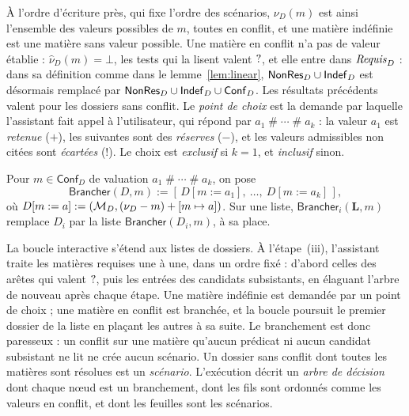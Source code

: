 \documentclass[review]{jflart}
\newcommand{\Brancher}{\ensuremath{\mathsf{Brancher}}}
\newcommand{\Liste}{\ensuremath{\mathbf L}}
\newcommand{\conflit}{\mathbin{\#}}
\newcommand{\Conf}{\ensuremath{\mathsf{Conf}_D}}
\begin{document}
À l'ordre d'écriture près, qui fixe l'ordre des scénarios, \(\nu_D(m)\) est
ainsi l'ensemble des valeurs possibles de \(m\), toutes en conflit, et une
matière indéfinie est une matière sans valeur possible. Une matière en conflit
n'a pas de valeur établie : \(\widehat\nu_D(m)=\bot\), les tests qui la lisent
valent \(\mathord{?}\), et elle entre dans \(\mathit{Requis}_D\) : dans sa définition
comme dans le lemme~\ref{lem:linear}, \(\mathsf{NonRes}_D\cup\mathsf{Indef}_D\) est désormais
remplacé par \(\Unres\cup\Undef\cup\Conf\).
Les résultats précédents valent pour les dossiers sans conflit. Le \emph{point
de choix} est la demande par laquelle l'assistant fait appel à l'utilisateur,
qui répond par \(a_1\conflit\cdots\conflit a_k\) : la valeur \(a_1\) est
\emph{retenue} (\(+\)), les suivantes sont des \emph{réserves} (\(-\)), et les
valeurs admissibles non citées sont \emph{écartées} (\(!\)). Le choix est
\emph{exclusif} si \(k=1\), et \emph{inclusif} sinon.

\begin{defi}[Branchement]\label{def:brancher}
Pour \(m\in\Conf\) de valuation \(a_1\conflit\cdots\conflit a_k\), on pose
\[
\Brancher(D,m):=[\,D[m:=a_1],\ \ldots,\ D[m:=a_k]\,],
\]
où \(D[m:=a]:=(\mathcal{M}_D,(\nu_D-m)+[m\mapsto a])\). Sur une liste,
\(\Brancher_i(\Liste,m)\) remplace \(D_i\) par la liste \(\Brancher(D_i,m)\),
à sa place.
\end{defi}

La boucle interactive s'étend aux listes de dossiers. À l'étape~(iii),
l'assistant traite les matières requises une à une, dans un ordre fixé :
d'abord celles des arêtes qui valent \(\mathord{?}\), puis les entrées des
candidats subsistants, en élaguant l'arbre de nouveau après chaque étape. Une
matière indéfinie est demandée par un point de choix ; une matière en conflit
est branchée, et la boucle poursuit le premier dossier de la liste en plaçant
les autres à sa suite. Le branchement est donc paresseux : un conflit sur une
matière qu'aucun prédicat ni aucun candidat subsistant ne lit ne crée aucun
scénario. Un dossier sans conflit dont toutes les matières sont résolues est un
\emph{scénario}. L'exécution décrit un \emph{arbre de décision} dont chaque
nœud est un branchement, dont les fils sont ordonnés comme les valeurs en
conflit, et dont les feuilles sont les scénarios.
\end{document}

